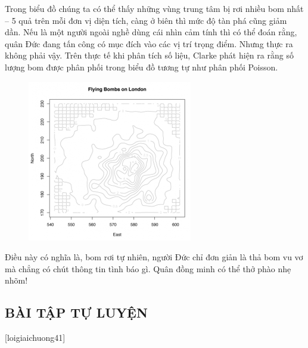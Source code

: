 Trong biểu đồ chúng ta có thể thấy những vùng trung tâm bị rơi nhiều bom nhất – 5 quả trên mỗi đơn vị diện tích, càng ở biên thì mức độ tàn phá cũng giảm dần. Nếu là một người ngoài nghề dùng cái nhìn cảm tính thì có thể đoán rằng, quân Đức đang tấn công có mục đích vào các vị trí trọng điểm. Nhưng thực ra không phải vậy. Trên thực tế khi phân tích số liệu, Clarke phát hiện ra rằng số lượng bom được phân phối trong biểu đồ tương tự như phân phối Poisson.
\begin{figure}[H]
	\centering
	\vspace*{-5pt}
	\captionsetup{labelformat= empty, justification=centering}
	\includegraphics[width=0.5\linewidth]{15}
	\vspace*{-10pt}
\end{figure}
Điều này có nghĩa là, bom rơi tự nhiên, người Đức chỉ đơn giản là thả bom vu vơ mà chẳng có chút thông tin tình báo gì. Quân đồng minh có thể thở phào nhẹ nhõm!
\subsection{BÀI TẬP TỰ LUYỆN}
[loigiaichuong41]
